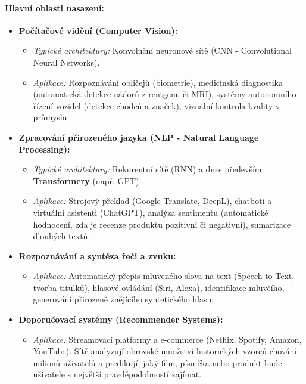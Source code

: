 \paragraph*{Hlavní oblasti nasazení:}
\begin{itemize}
    \item \textbf{Počítačové vidění (Computer Vision):}
    \begin{itemize}
        \item \textit{Typické architektury:} Konvoluční neuronové sítě (CNN - Convolutional Neural Networks).
        \item \textit{Aplikace:} Rozpoznávání obličejů (biometrie), medicínská diagnostika (automatická detekce nádorů z rentgenu či MRI), systémy autonomního řízení vozidel (detekce chodců a značek), vizuální kontrola kvality v průmyslu.
    \end{itemize}
    
    \item \textbf{Zpracování přirozeného jazyka (NLP - Natural Language Processing):}
    \begin{itemize}
        \item \textit{Typické architektury:} Rekurentní sítě (RNN) a dnes především \textbf{Transformery} (např. GPT).
        \item \textit{Aplikace:} Strojový překlad (Google Translate, DeepL), chatboti a virtuální asistenti (ChatGPT), analýza sentimentu (automatické hodnocení, zda je recenze produktu pozitivní či negativní), sumarizace dlouhých textů.
    \end{itemize}

    \item \textbf{Rozpoznávání a syntéza řeči a zvuku:}
    \begin{itemize}
        \item \textit{Aplikace:} Automatický přepis mluveného slova na text (Speech-to-Text, tvorba titulků), hlasové ovládání (Siri, Alexa), identifikace mluvčího, generování přirozeně znějícího syntetického hlasu.
    \end{itemize}

    \item \textbf{Doporučovací systémy (Recommender Systems):}
    \begin{itemize}
        \item \textit{Aplikace:} Streamovací platformy a e-commerce (Netflix, Spotify, Amazon, YouTube). Sítě analyzují obrovské množství historických vzorců chování milionů uživatelů a predikují, jaký film, písnička nebo produkt bude uživatele s největší pravděpodobností zajímat.
    \end{itemize}


\end{itemize}

